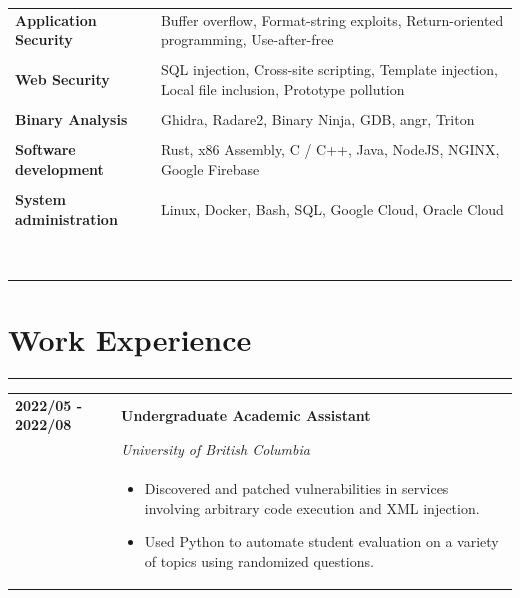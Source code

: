 \documentclass[letterpaper]{article}
\newcommand{\sectcolor}{cyan}
\newcommand{\sect}[1]{\section*{#1}
                        {\color{\sectcolor}
                        \rule{\textwidth}{1pt}
                        \vspace{-7pt}}}
\begin{document}
        \begin{tabular}{>{\raggedleft\arraybackslash}p{}
                        p{}}
            \textbf{Application Security} &
                Buffer overflow,
                Format-string exploits,
                Return-oriented programming,
                Use-after-free
                \\\\
            \textbf{Web Security} &
                SQL injection,
                Cross-site scripting,
                Template injection,
                Local file inclusion,
                Prototype pollution
                \\\\
            \textbf{Binary Analysis} &
                Ghidra,
                Radare2,
                Binary Ninja,
                GDB,
                angr,
                Triton
                \\\\
            \textbf{Software development} &
                Rust,
                x86 Assembly,
                C / C++,
                Java,
                NodeJS,
                NGINX,
                Google Firebase
                \\\\
            \textbf{System administration} &
                Linux,
                Docker,
                Bash,
                SQL,
                Google Cloud,
                Oracle Cloud
                \\\\

                \\\\\\\\\\\\\\\\
        \end{tabular}

    \sect{Work Experience}

        \begin{tabular}{p{} p{}}
            \textbf{2022/05 - 2022/08} & \textbf{Undergraduate Academic Assistant} \\
            & \emph{University of British Columbia} \\
            & \begin{itemize}
                \item Discovered and patched vulnerabilities in services involving arbitrary code
                    execution and XML injection.
                \item Used Python to automate student evaluation on a variety of topics using randomized
                    questions.
            \end{itemize}
        \end{tabular}
\end{document}
